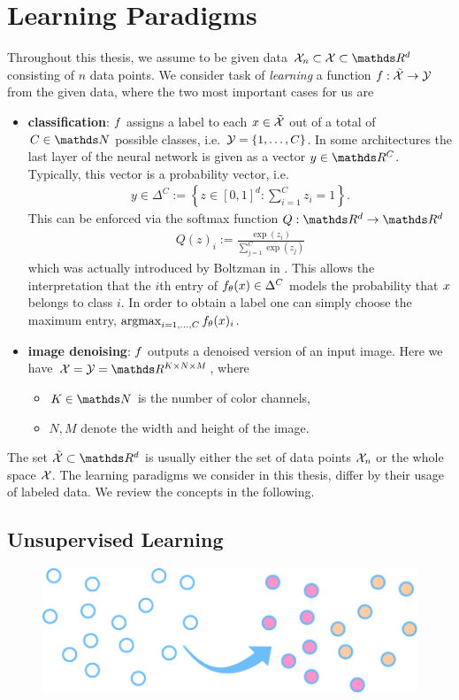 \chapter{Learning Paradigms}\label{ch:para}

Throughout this thesis, we assume to be given data $\Inp_n\subset\Inp\subset \R^d$ consisting of $n$ data points. We consider task of \emph{learning} a function $f:\tilde{\mathcal{X}}\to \mathcal{\mathcal{Y}}$ from the given data, where the two most important cases for us are
%
\begin{itemize}
\item \textbf{classification}: $f$ assigns a label to each $x\in \tilde{\mathcal{X}}$ out of a total of $C\in\N$ possible classes, i.e. $\mathcal{\mathcal{Y}}=\{1,\ldots,C\}$. In some architectures the last layer of the neural network is given as a vector $\oup\in\R^C$. Typically, this vector is a probability vector, i.e. 
%
\begin{align*}
y\in \Delta^C := \left\{z\in[0,1]^d: \sum_{i=1}^C z_i = 1\right\}.
\end{align*}
%
This can be enforced via the softmax function \cite{bridle1990probabilistic} $Q:\R^d\to\R^d$
%
\begin{align*}
	Q(z)_i := \frac{\exp(z_i)}{\sum_{j=1}^C \exp(z_j)} 	
\end{align*}
%
which was actually introduced by Boltzman in \cite{boltzmann1868studien}. This allows the interpretation that the $i$th entry of $f_\theta(x)\in\Delta^C$ models the probability that $x$ belongs to class $i$. In order to obtain a label one can simply choose the maximum entry, $\operatorname{argmax}_{i=1,\ldots,C} f_\theta(x)_i$.
%
\item \textbf{image denoising}: $f$ outputs a denoised version of an input image. Here we have $\Inp = \Oup=\R^{K\times N\times M}$, where
%
\begin{itemize}
\item $K\in\N$ is the number of color channels,
\item $N,M$ denote the width and height of the image.
\end{itemize}
\end{itemize}
%
The set $\tilde{\Inp}\subset\R^d$ is usually either the set of data points $\mathcal{X}_n$ or the whole space $\mathcal{X}$. The learning paradigms we consider in this thesis, differ by their usage of labeled data. We review the concepts in the following.
%
\section{Unsupervised Learning}
\begin{figure}
\centering
\includegraphics[width=.5\textwidth]{atelier/paradigms/UL.pdf}
\end{figure}

